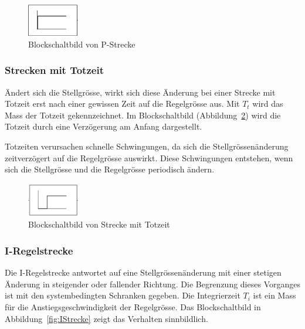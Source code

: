 \begin{figure}[h!, width=\pagewidth]
    \centering
    \includegraphics[width=0.2\textwidth]{images/PStrecke}
    \caption{Blockschaltbild von P-Strecke}
    \label{fig:PStrecke}
\end{figure}


\subsubsection*{Strecken mit Totzeit}
\"Andert  sich  die  Stellgr\"osse,  wirkt sich  diese  \"Anderung  bei  einer
Strecke  mit Totzeit  erst  nach  einer gewissen  Zeit  auf die  Regelgr\"osse
aus. Mit $T_t$  wird das  Mass der Totzeit  gekennzeichnet. Im Blockschaltbild
(Abbildung~\ref{fig:TotZeit})  wird die  Totzeit durch  eine Verz\"ogerung  am
Anfang dargestellt.

Totzeiten     verursachen    schnelle     Schwingungen,     da    sich     die
Stellgr\"ossen\"anderung zeitverz\"ogert auf die Regelgr\"osse auswirkt. Diese
Schwingungen  entstehen, wenn sich  die  Stellgr\"osse  und die  Regelgr\"osse
periodisch \"andern.

\begin{figure}[h!, width=\pagewidth]
    \centering
    \includegraphics[width=0.2\textwidth]{images/Totzeit}
    \caption{Blockschaltbild von Strecke mit Totzeit}
    \label{fig:TotZeit}
\end{figure}


\subsubsection*{I-Regelstrecke}

Die  I-Regelstrecke  antwortet  auf eine  Stellgr\"ossen\"anderung  mit  einer
stetigen  \"Anderung in  steigender  oder  fallender Richtung. Die  Begrenzung
dieses   Vorganges  ist   mit  den   systembedingten  Schranken   gegeben. Die
Integrierzeit  $T_i$  ist  ein  Mass  f\"ur  die  Anstiegsgeschwindigkeit  der
Regelgr\"osse. Das Blockschaltbild  in Abbildung~\ref{fig:IStrecke}  zeigt das
Verhalten sinnbildlich.


